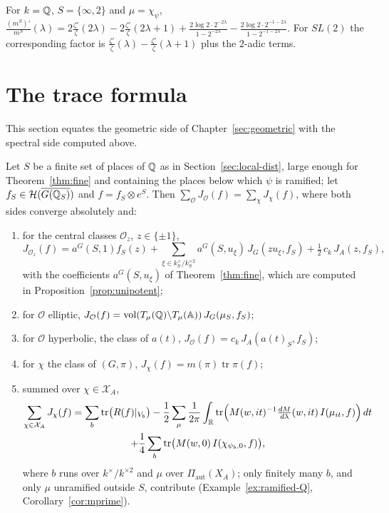 \begin{example}\label{ex:mprime-Q}
For $k=\mathbb{Q}$, $S=\{\infty,2\}$ and $\mu=\chi_\psi$,
$\frac{(m^S)'}{m^S}(\lambda)=2\frac{\zeta'}{\zeta}(2\lambda)
-2\frac{\zeta'}{\zeta}(2\lambda+1)+\frac{2\log2\cdot2^{-2\lambda}}
{1-2^{-2\lambda}}-\frac{2\log2\cdot2^{-1-2\lambda}}{1-2^{-1-2\lambda}}$.
For $SL(2)$ the corresponding factor is
$\frac{\zeta'}{\zeta}(\lambda)-\frac{\zeta'}{\zeta}(\lambda+1)$ plus the
$2$-adic terms.
\end{example}

\section{The trace formula}\label{sec:tf}

This section equates the geometric side of
Chapter~\ref{sec:geometric} with the spectral side computed above.


\begin{theorem}\label{thm:tf}
Let $S$ be a finite set of places of $\mathbb{Q}$ as in
Section~\ref{sec:local-dist}, large enough for Theorem~\ref{thm:fine} and
containing the places below which $\psi$ is ramified; let $f_S\in
\mathcal H(\overline{G(\mathbb{Q}_S)})$ and $f=f_S\otimes e^S$. Then
$\sum_{\mathcal O}J_{\mathcal O}(f)=\sum_{\chi}J_\chi(f)$, where both
sides converge absolutely and:
\begin{enumerate}[label=(\alph*)]
\item for the central classes $\mathcal O_z$, $z\in\{\pm1\}$,
  \[
  J_{\mathcal O_z}(f)=a^G(S,1)f_S(z)+\sum_{\xi\in k_S^\times/k_S^{\times2}}
  a^G(S,u_\xi)\,J_G(zu_\xi,f_S)+\tfrac12\,c_k\,J_A(z,f_S),
  \]
  with the coefficients $a^G(S,u_\xi)$ of Theorem~\ref{thm:fine}, which
  are computed in Proposition~\ref{prop:unipotent};
\item for $\mathcal O$ elliptic, $J_{\mathcal O}(f)=
  \operatorname{vol}(T_\mu(\mathbb{Q})\backslash T_\mu(\mathbb{A}))\,J_G(\mu_S,f_S)$;
\item for $\mathcal O$ hyperbolic, the class of $a(t)$,
  $J_{\mathcal O}(f)=c_k\,J_A(a(t)_S,f_S)$;
\item for $\chi$ the class of $(G,\pi)$, $J_\chi(f)=m(\pi)
  \operatorname{tr}\pi(f)$;
\item summed over $\chi\in\mathcal X_A$,
  \begin{multline*}
  \sum_{\chi\in\mathcal X_A}J_\chi(f)=\sum_{b}\operatorname{tr}
  \bigl(R(f)|_{V_b}\bigr)
  -\frac12\sum_{\mu}\frac1{2\pi}\int_{\mathbb{R}}\operatorname{tr}\Bigl(M(w,it)^{-1}
  \tfrac{dM}{d\lambda}(w,it)\,I(\mu_{it},f)\Bigr)\,dt\\
  +\frac14\sum_b\operatorname{tr}\bigl(M(w,0)\,I(\chi_{\psi_b,0},f)
  \bigr),
  \end{multline*}
  where $b$ runs over $k^\times/k^{\times2}$ and $\mu$ over
  $\Pi_{\mathrm{aut}}(X_A)$; only finitely many $b$, and only $\mu$
  unramified outside $S$, contribute (Example~\ref{ex:ramified-Q},
  Corollary~\ref{cor:mprime}).
\end{enumerate}
\end{theorem}

